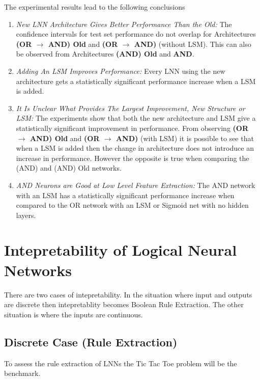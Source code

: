 The experimental results lead to the following conclusions
\begin{enumerate}
	\item \textit{New LNN Architecture Gives Better Performance Than the Old:} The confidence intervals for test set performance do not overlap for Architectures \textbf{(OR $\rightarrow$ AND) Old} and \textbf{(OR $\rightarrow$ AND)} (without LSM). This can also be observed from Architectures \textbf{(AND) Old} and \textbf{AND}.
	
	\item \textit{Adding An LSM Improves Performance:} Every LNN using the new architecture gets a statistically significant performance increase when a LSM is added.

	\item \textit{It Is Unclear What Provides The Largest Improvement, New Structure or LSM:} The experiments show that both the new architecture and LSM give a statistically significant improvement in performance. From observing \textbf{(OR $\rightarrow$ AND) Old} and \textbf{(OR $\rightarrow$ AND)} (with LSM) it is possible to see that when a LSM is added then the change in architecture does not introduce an increase in performance. However the opposite is true when comparing the (AND) and (AND) Old networks.
	
	\item \textit{AND Neurons are Good at Low Level Feature Extraction:} The AND network with an LSM has a statistically significant performance increase when compared to the OR network with an LSM or Sigmoid net with no hidden layers.
\end{enumerate}

\section{Intepretability of Logical Neural Networks}
There are two cases of intepretability. In the situation where input and outputs are discrete then intepretablity becomes Boolean Rule Extraction. The other situation is where the inputs are continuous.

\subsection{Discrete Case (Rule Extraction)}
To assess the rule extraction of LNNs the Tic Tac Toe  \cite{Lichman:2013} problem will be the benchmark. 


